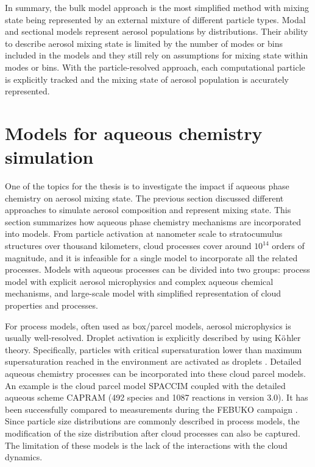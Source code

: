 \documentclass[edeposit,fullpage]{uiucthesis2009}
\begin{document}
In summary, the bulk model approach is the most simplified method with
mixing state being represented by an external mixture of different
particle types. Modal and sectional models represent aerosol
populations by distributions. Their ability to describe aerosol mixing
state is limited by the number of modes or bins included in the models
and they still rely on assumptions for mixing state within modes or
bins. With the particle-resolved approach, each computational particle
is explicitly tracked and the mixing state of aerosol population is
accurately represented.

\section{Models for aqueous chemistry simulation }
One of the topics for the thesis is to investigate the impact if
aqueous phase chemistry on aerosol mixing state. The previous section
discussed different approaches to simulate aerosol composition and
represent mixing state. This section summarizes how aqueous phase
chemistry mechanisms are incorporated into models. From particle
activation at nanometer scale to stratocumulus structures over
thousand kilometers, cloud processes cover around $10^{14}$ orders of
magnitude, and it is infeasible for a single model to incorporate all
the related processes. Models with aqueous processes can be divided
into two groups: process model with explicit aerosol microphysics and
complex aqueous chemical mechanisms, and
large-scale model with simplified representation of cloud properties
and processes.

For process models, often used as box/parcel models, aerosol
microphysics is usually well-resolved. Droplet activation is
explicitly described by using K$\rm \ddot{o}$hler
theory. Specifically, particles with critical supersaturation lower
than maximum supersaturation reached in the environment are activated
as droplets \citep{rothenberg2016metamodeling,
  ching2012impacts}. Detailed aqueous chemistry processes can be
incorporated into these cloud parcel models. An example is the cloud
parcel model SPACCIM coupled with the detailed aqueous scheme CAPRAM
(492 species and 1087 reactions in version 3.0). It has been
successfully compared to measurements during the FEBUKO campaign
\citep{wolke2005spaccim}. Since particle size distributions are
commonly described in process models, the modification of the size
distribution after cloud processes can also be captured. The
limitation of these models is the lack of the interactions with the
cloud dynamics. 
\end{document}
